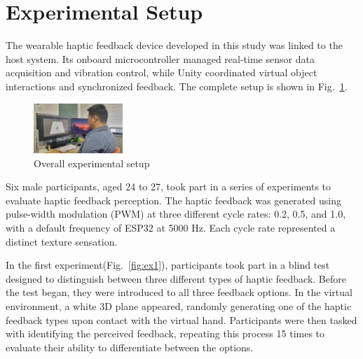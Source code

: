 \documentclass[a4paper,twocolumn]{article}
\begin{document}

\section{Experimental Setup}
The wearable haptic feedback device developed in this study was linked to the host system. Its onboard microcontroller managed real-time sensor data acquisition and vibration control, while Unity coordinated virtual object interactions and synchronized feedback. The complete setup is shown in Fig.~\ref{fig:experiment}.
\begin{figure}[H]\centering
	\includegraphics[width=0.3\textwidth]{Fig/experiment.png}%
	\caption{Overall experimental setup}\label{fig:experiment}%
\end{figure}

Six male participants, aged 24 to 27, took part in a series of experiments to evaluate haptic feedback perception. The haptic feedback was generated using pulse-width modulation (PWM) at three different cycle rates: 0.2, 0.5, and 1.0, with a default frequency of ESP32 at 5000 Hz. Each cycle rate represented a distinct texture sensation.

In the first experiment(Fig.~\ref{fig:ex1}), participants took part in a blind test designed to distinguish between three different types of haptic feedback. Before the test began, they were introduced to all three feedback options. In the virtual environment, a white 3D plane appeared, randomly generating one of the haptic feedback types upon contact with the virtual hand. Participants were then tasked with identifying the perceived feedback, repeating this process 15 times to evaluate their ability to differentiate between the options.
\end{document}
